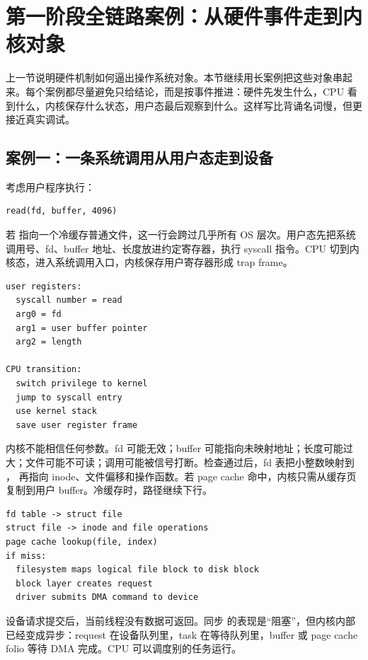 \section{第一阶段全链路案例：从硬件事件走到内核对象}

上一节说明硬件机制如何逼出操作系统对象。本节继续用长案例把这些对象串起来。每个案例都尽量避免只给结论，而是按事件推进：硬件先发生什么，CPU 看到什么，内核保存什么状态，用户态最后观察到什么。这样写比背诵名词慢，但更接近真实调试。

\subsection{案例一：一条系统调用从用户态走到设备}

考虑用户程序执行：

\begin{lstlisting}
read(fd, buffer, 4096)
\end{lstlisting}

若  指向一个冷缓存普通文件，这一行会跨过几乎所有 OS 层次。用户态先把系统调用号、fd、buffer 地址、长度放进约定寄存器，执行 syscall 指令。CPU 切到内核态，进入系统调用入口，内核保存用户寄存器形成 trap frame。

\begin{lstlisting}
user registers:
  syscall number = read
  arg0 = fd
  arg1 = user buffer pointer
  arg2 = length

CPU transition:
  switch privilege to kernel
  jump to syscall entry
  use kernel stack
  save user register frame
\end{lstlisting}

内核不能相信任何参数。fd 可能无效；buffer 可能指向未映射地址；长度可能过大；文件可能不可读；调用可能被信号打断。检查通过后，fd 表把小整数映射到 ， 再指向 inode、文件偏移和操作函数。若 page cache 命中，内核只需从缓存页复制到用户 buffer。冷缓存时，路径继续下行。

\begin{lstlisting}
fd table -> struct file
struct file -> inode and file operations
page cache lookup(file, index)
if miss:
  filesystem maps logical file block to disk block
  block layer creates request
  driver submits DMA command to device
\end{lstlisting}

设备请求提交后，当前线程没有数据可返回。同步  的表现是“阻塞”，但内核内部已经变成异步：request 在设备队列里，task 在等待队列里，buffer 或 page cache folio 等待 DMA 完成。CPU 可以调度别的任务运行。

